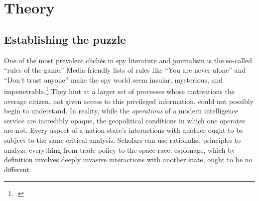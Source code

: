\documentclass[14pt]{extarticle}
\begin{document}



\section{Theory}
\subsection{Establishing the puzzle}
One of the most prevalent clich\'es in spy literature and journalism is the so-called \enquote{rules of the game.} Media-friendly lists of rules like \enquote{You are never alone} and \enquote{Don't trust anyone} make the spy world seem insular, mysterious, and impenetrable.\footcite{myre_moscow_2019} They hint at a larger set of processes whose motivations the average citizen, not given access to this privileged information, could not possibly begin to understand. In reality, while the \emph{operations} of a modern intelligence service are incredibly opaque, the geopolitical conditions in which one operates are not. Every aspect of a nation-state's interactions with another ought to be subject to the same critical analysis. Scholars can use rationalist principles to analyze everything from trade policy to the space race; espionage, which by definition involves deeply invasive interactions with another state, ought to be no different.
\end{document}
